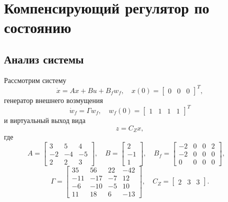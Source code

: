 \section{Компенсирующий регулятор по состоянию}
\subsection{Анализ системы}
\label{sec:task1}
Рассмотрим систему 
\begin{equation}
    \dot x=Ax+Bu+B_fw_f,\quad x(0)=\begin{bmatrix}
        0&0&0
    \end{bmatrix}^T,
    \label{eq:sys1}
\end{equation}
генератор внешнего возмущения
\begin{equation*}
    \dot w_f=\Gamma w_f,\quad w_f(0)=\begin{bmatrix}
        1&1&1&1
    \end{bmatrix}^T
\end{equation*}
и виртуальный выход вида
\begin{equation*}
    z=C_Zx,
\end{equation*}
где
\begin{equation*}
    A=\begin{bmatrix}
        3&5&4\\
        -2&-4&-5\\
        2&2&3
    \end{bmatrix},\quad
    B=\begin{bmatrix}
        2\\-1\\1
    \end{bmatrix},\quad
    B_f=\begin{bmatrix}
        -2&0&0&2\\
        -2&0&0&0\\
        0&0&0&0
    \end{bmatrix},\quad
\end{equation*}
\begin{equation*}
    \Gamma=\begin{bmatrix}
        35&56&22&-42\\
        -11&-17&-7&12\\
        -6&-10&-5&10\\
        11&18&6&-13
    \end{bmatrix},\quad
    C_Z=\begin{bmatrix}
        2&3&3
    \end{bmatrix}.
\end{equation*}
